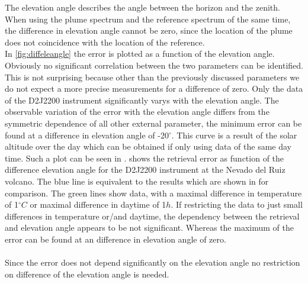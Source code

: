 The elevation angle describes the angle between the horizon and the zenith. When using the plume spectrum and the reference spectrum of the same time, the difference in elevation angle cannot be zero, since the location of the plume does not coincidence with the location of the reference.\\
In \cref{fig:diffeleangle} the  error is plotted as a function of the elevation angle. Obviously no significant correlation between the two parameters can be identified. This is not surprising because other than the previously discussed parameters we do not expect a more precise measurements for a difference of zero. 
Only the data of the D2J2200 instrument significantly varys with the elevation angle. The observable variation of the  error with the elevation angle differs from the symmetric dependence of all other external parameter, the minimum  error can be found at a difference in elevation angle of -20$^{\circ}$. This curve is a result of the solar altitude over the day which can be obtained if only using data of the same day time. Such a plot can be seen in .
 shows the  retrieval error as function of the difference elevation angle for the D2J2200 instrument at the Nevado del Ruiz volcano. The blue line is equivalent to the results which are shown in  for comparison. The green lines show data, with a maximal difference in temperature of 1$^{\circ}C$ or maximal difference in daytime of 1$h$. If restricting the data to just small differences in temperature or/and daytime, the dependency between the  retrieval and elevation angle appears to be not significant. Whereas the maximum of the  error can be found at an difference in elevation angle of zero.\\
\\	
Since the  error does not depend significantly on the elevation angle no restriction on difference of the elevation angle is needed.
